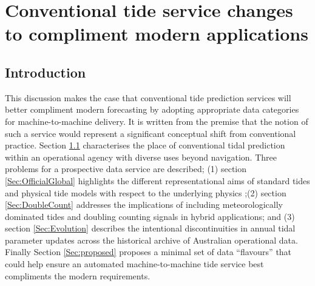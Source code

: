 
\chapter{Conventional tide service changes to compliment modern applications}

\newcommand{\Ba}{63540}
\newcommand{\Ca}{46290}
\newcommand{\Da}{62430}
\newcommand{\Ea}{62290}
\newcommand{\Fa}{61561}
\newcommand{\Ga}{57720}

\newcommand{\Bb}{529020}
\newcommand{\Cb}{200970}
\newcommand{\Db}{005096}
\newcommand{\Eb}{008314}
\newcommand{\Fb}{523757}
\newcommand{\Gb}{200854}

\newcommand{\Bname}{Mornington Island}
\newcommand{\Cname}{Christmas Island}
\newcommand{\Dname}{Point Murat}
\newcommand{\Ename}{Geraldton}
\newcommand{\Fname}{Cape Jervis}
\newcommand{\Gname}{Lord Howe Island}

\newcommand{\figwidthFull}{0.75\textwidth}
\newcommand{\figwidthBig}{0.55\textwidth}
\newcommand{\figwidthHalf}{0.35\textwidth}
\newcommand{\figwidthThird}{0.22\textwidth}
\section{Introduction}
\label{Sec:intro}
This discussion makes the case that conventional tide prediction services will better compliment modern forecasting by adopting appropriate data categories for machine-to-machine delivery.  It is written from the premise that the notion of such a service would represent a significant conceptual shift from conventional practice.  Section \ref{Sec:intro} characterises the place of conventional tidal prediction within an operational agency with diverse uses beyond navigation. Three problems for a prospective data service are described; (1) section \ref{Sec:OfficialGlobal} highlights the different representational aims of standard tides and physical tide models with respect to the underlying physics ;(2) section \ref{Sec:DoubleCount} addresses the implications of including meteorologically dominated tides and doubling counting signals in hybrid applications; and (3) section \ref{Sec:Evolution} describes the intentional discontinuities in annual tidal parameter updates across the historical archive of Australian operational data.   Finally Section \ref{Sec:proposed} proposes a minimal set of data ``flavours'' that could help ensure an automated machine-to-machine tide service best compliments the modern requirements. 


